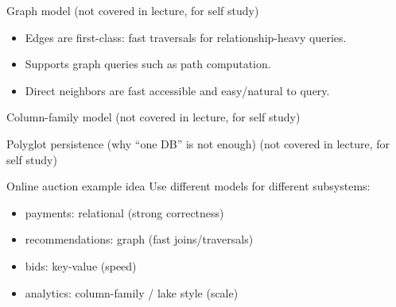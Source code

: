 \documentclass[10pt,aspectratio=169]{beamer}
\newenvironment{examplebox}[1][Example]{\begin{exampleblock}{#1}}{\end{exampleblock}}
\begin{document}
\begin{frame}{Graph model (not covered in lecture, for self study)}
\centering
{}
\begin{itemize} 
 \item Edges are first-class: fast traversals for relationship-heavy queries. \item Supports graph queries such as path computation.
 \item Direct neighbors are fast accessible and easy/natural to query.
\end{itemize}
\end{frame}

\begin{frame}{Column-family model (not covered in lecture, for self study)}
\centering
{}
\end{frame}

\begin{frame}{Polyglot persistence (why “one DB” is not enough) (not covered in lecture, for self study)}
\begin{examplebox}[Online auction example idea]
Use different models for different subsystems:
\begin{itemize}
  \item payments: relational (strong correctness)
  \item recommendations: graph (fast joins/traversals)
  \item bids: key-value (speed)
  \item analytics: column-family / lake style (scale)
\end{itemize}
\end{examplebox}
\end{frame}
\end{document}
